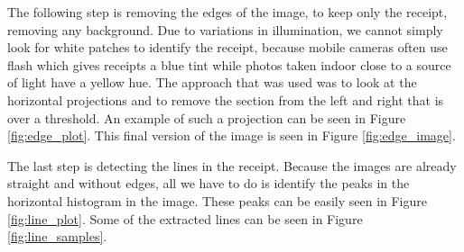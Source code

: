 The following step is removing the edges of the image, to keep only the receipt, removing any background. Due to variations in illumination, we cannot simply look for white patches to identify the receipt, because mobile cameras often use flash which gives receipts a blue tint while photos taken indoor close to a source of light have a yellow hue. The approach that was used was to look at the horizontal projections and to remove the section from the left and right that is over a threshold. An example of such a projection can be seen in Figure \ref{fig:edge_plot}. This final version of the image is seen in Figure \ref{fig:edge_image}.

The last step is detecting the lines in the receipt. Because the images are already straight and without edges, all we have to do is identify the peaks in the horizontal histogram in the image. These peaks can be easily seen in Figure \ref{fig:line_plot}. Some of the extracted lines can be seen in Figure \ref{fig:line_samples}.


